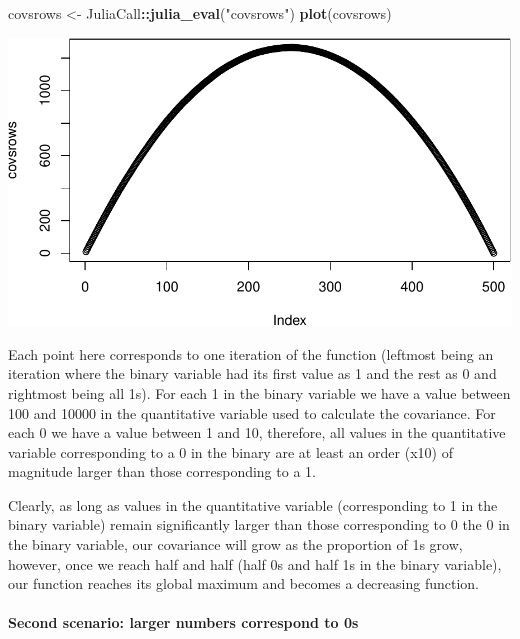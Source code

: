 \documentclass[]{article}
\newenvironment{Shaded}{\begin{snugshade}}{\end{snugshade}}
\newcommand{\KeywordTok}[1]{\textcolor[rgb]{0.13,0.29,0.53}{\textbf{#1}}}
\newcommand{\NormalTok}[1]{#1}
\newcommand{\OperatorTok}[1]{\textcolor[rgb]{0.81,0.36,0.00}{\textbf{#1}}}
\newcommand{\StringTok}[1]{\textcolor[rgb]{0.31,0.60,0.02}{#1}}
\let\oldparagraph\paragraph
\renewcommand{\paragraph}[1]{\oldparagraph{#1}\mbox{}}
\begin{document}
\begin{Shaded}
\begin{Highlighting}[]
\NormalTok{covsrows <-}\StringTok{ }\NormalTok{JuliaCall}\OperatorTok{::}\KeywordTok{julia_eval}\NormalTok{(}\StringTok{"covsrows"}\NormalTok{)}
\KeywordTok{plot}\NormalTok{(covsrows)}
\end{Highlighting}
\end{Shaded}

\includegraphics{./figures/unnamed-chunk-11-1.pdf}

Each point here corresponds to one iteration of the function (leftmost
being an iteration where the binary variable had its first value as 1
and the rest as 0 and rightmost being all 1s). For each 1 in the binary
variable we have a value between 100 and 10000 in the quantitative
variable used to calculate the covariance. For each 0 we have a value
between 1 and 10, therefore, all values in the quantitative variable
corresponding to a 0 in the binary are at least an order (x10) of
magnitude larger than those corresponding to a 1.

Clearly, as long as values in the quantitative variable (corresponding
to 1 in the binary variable) remain significantly larger than those
corresponding to 0 the 0 in the binary variable, our covariance will
grow as the proportion of 1s grow, however, once we reach half and half
(half 0s and half 1s in the binary variable), our function reaches its
global maximum and becomes a decreasing function.

\newpage

\hypertarget{second-scenario-larger-numbers-correspond-to-0s}{%
\paragraph{Second scenario: larger numbers correspond to
0s}\label{second-scenario-larger-numbers-correspond-to-0s}}
\end{document}
